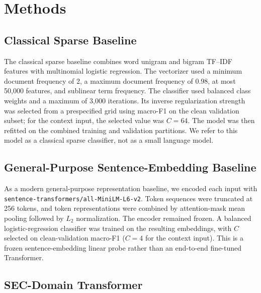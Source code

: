 \documentclass[11pt]{article}
\begin{document}
\section{Methods}
\label{sec:methods}

\subsection{Classical Sparse Baseline}

The classical sparse baseline combines word unigram and bigram TF--IDF features
with multinomial logistic regression. The vectorizer used a minimum document
frequency of 2, a maximum document frequency of 0.98, at most 50,000 features,
and sublinear term frequency. The classifier used balanced class weights and a
maximum of 3,000 iterations. Its inverse regularization strength was selected
from a prespecified grid using macro-F1 on the clean validation subset; for the
context input, the selected value was $C=64$. The model was then refitted on the
combined training and validation partitions. We refer to this model as a
classical sparse classifier, not as a small language model.

\subsection{General-Purpose Sentence-Embedding Baseline}

As a modern general-purpose representation baseline, we encoded each input with
\texttt{sentence-transformers/all-MiniLM-L6-v2}. Token sequences were truncated at
256 tokens, and token representations were combined by attention-mask mean
pooling followed by $L_2$ normalization. The encoder remained frozen. A balanced
logistic-regression classifier was trained on the resulting embeddings, with
$C$ selected on clean-validation macro-F1 ($C=4$ for the context input). This is
a frozen sentence-embedding linear probe rather than an end-to-end fine-tuned
Transformer.

\subsection{SEC-Domain Transformer}
\end{document}
